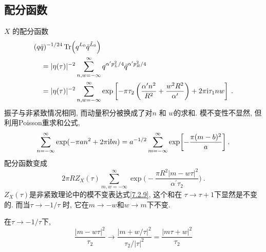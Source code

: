 \subsection*{配分函数}
 $X$ 的配分函数
	\begin{align}
		&(q \bar{q})^{-1 / 24} \operatorname{Tr}\Bigl(q^{L_{0}} \bar{q}^{\tilde{L}_{0}}\Bigr) \nonumber \\
		&\quad =|\eta(\tau)|^{-2} \sum_{n, w=-\infty}^{\infty} q^{\alpha^{\prime} p_{L}^{2} / 4} \bar{q}^{\alpha^{\prime} p_{R}^{2} / 4} \nonumber \\
		&\quad =|\eta(\tau)|^{-2} \sum_{n, w=-\infty}^{\infty} \exp \left[-\pi \tau_{2}\left(\frac{\alpha^{\prime} n^{2}}{R^{2}}+\frac{w^{2} R^{2}}{\alpha^{\prime}}\right)+2 \pi \mathrm{i} \tau_{1} n w\right] \:. \label{8.2.9}
	\end{align}
振子与非紧致情况相同, 而动量积分被换成了对$n$ 和 $w$的求和. 模不变性不显然, 但利用Poisson重求和公式,
\begin{equation}
	\sum_{n=-\infty}^{\infty} \exp (-\pi a n^{2}+2 \pi \mathrm{i} b n)=a^{-1 / 2} 
	\sum_{m=-\infty}^{\infty} \exp \biggl[-\frac{\pi(m-b)^{2}}{a}\biggr] \:. \label{8.2.10}
\end{equation}
配分函数变成
\begin{equation}
	2 \pi R Z_{X}(\tau) \sum_{m, w=-\infty}^{\infty} \exp \biggl(-\frac{\pi R^{2}|m-w \tau|^{2}}{\alpha^{\prime} \tau_{2}}\biggr) \:. \label{8.2.11}
\end{equation}
$Z_{X}(\tau)$是非紧致理论中的模不变表达式\eqref{7.2.9}, 这个和在 $\tau \rightarrow \tau+1$下显然是不变的. 而当$\tau \rightarrow-1 / \tau$ 时, 它在$m\to-w$和$w\to m$下不变.

\begin{tcolorbox}
	\begin{remark}
		在$\tau \to -1/\tau$下, 
		\[
			\frac{|m-w \tau|^{2}}{\tau_{2}} \rightarrow \frac{| m+w / \tau|^{2}}{\tau_{2} /|\tau|^{2}}=\frac{|m \tau+w|^{2}}{\tau_{2}}	
		\]
	\end{remark}
\end{tcolorbox}


